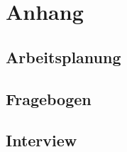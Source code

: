 \part{Anhang}
\begin{appendix}

  
  
  
  \chapter{Arbeitsplanung}
  
  \chapter{Fragebogen}
  
  \chapter{Interview}
  
  

\end{appendix}